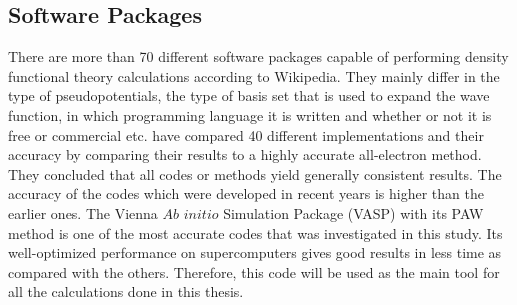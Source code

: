 \subsection{Software Packages}
There are more than 70 different software packages capable of performing density functional theory calculations according to Wikipedia\cite{dft_sws}. They mainly differ in the type of pseudopotentials, the type of basis set that is used to expand the wave function, in which programming language it is written and whether or not it is free or commercial etc. \citet{Lejaeghereaad3000} have compared 40 different implementations and their accuracy by comparing their results to a highly accurate all-electron method. They concluded that all codes or methods yield generally consistent results. The accuracy of the codes which were developed in recent years is higher than the earlier ones. The Vienna $Ab$ $initio$ Simulation Package (VASP)\cite{VASP1,VASP2} with its PAW method is one of the most accurate codes that was investigated in this study. Its well-optimized performance on supercomputers gives good results in less time as compared with the others. Therefore, this code will be used as the main tool for all the calculations done in this thesis.